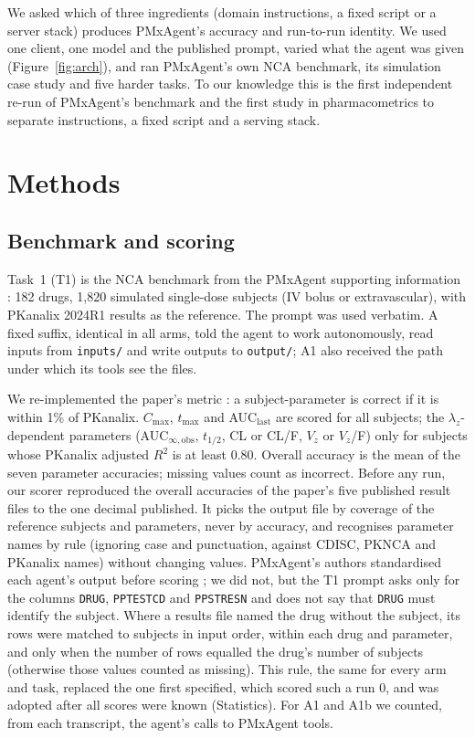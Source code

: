 \documentclass[11pt]{article}
\begin{document}
We asked which of three ingredients (domain instructions, a fixed script or a server stack) produces PMxAgent's accuracy
and run-to-run identity. We used one client, one model and the published prompt, varied what the agent was given
(Figure~\ref{fig:arch}), and ran PMxAgent's own NCA benchmark, its simulation case study and five harder tasks. To our
knowledge this is the first independent re-run of PMxAgent's benchmark and the first study in pharmacometrics to
separate instructions, a fixed script and a serving stack.

\section{Methods}
\subsection{Benchmark and scoring}
Task~1 (T1) is the NCA benchmark from the PMxAgent supporting information \cite{bloomingdale2026pmxagent}: 182 drugs,
1,820 simulated single-dose subjects (IV bolus or extravascular), with PKanalix 2024R1 results as the reference. The
prompt was used verbatim. A fixed suffix, identical in all arms, told the agent to work autonomously, read inputs from
\texttt{inputs/} and write outputs to \texttt{output/}; A1 also received the path under which its tools see the files.

We re-implemented the paper's metric \cite{bloomingdale2026pmxagent}: a subject-parameter is correct if it is within
1\% of PKanalix. $C_\mathrm{max}$, $t_\mathrm{max}$ and AUC$_\mathrm{last}$ are scored for all subjects; the
$\lambda_z$-dependent parameters (AUC$_{\infty,\mathrm{obs}}$, $t_{1/2}$, CL or CL/F, $V_z$ or $V_z$/F) only for
subjects whose PKanalix adjusted $R^2$ is at least 0.80. Overall accuracy is the mean of the seven parameter
accuracies; missing values count as incorrect. Before any run, our scorer reproduced the overall accuracies of the
paper's five published result files to the one decimal published. It picks the output file by coverage of the reference
subjects and parameters, never by accuracy, and recognises parameter names by rule (ignoring case and punctuation,
against CDISC, PKNCA and PKanalix names) without changing values. PMxAgent's authors standardised each agent's output
before scoring \cite{bloomingdale2026pmxagent}; we did not, but the T1 prompt asks only for the columns \texttt{DRUG},
\texttt{PPTESTCD} and \texttt{PPSTRESN} and does not say that \texttt{DRUG} must identify the subject. Where a results
file named the drug without the subject, its rows were matched to subjects in input order, within each drug and
parameter, and only when the number of rows equalled the drug's number of subjects (otherwise those values counted as
missing). This rule, the same for every arm and task, replaced the one first specified, which scored such a run 0, and
was adopted after all scores were known (Statistics). For A1 and A1b we counted, from each transcript, the agent's calls
to PMxAgent tools.
\end{document}
